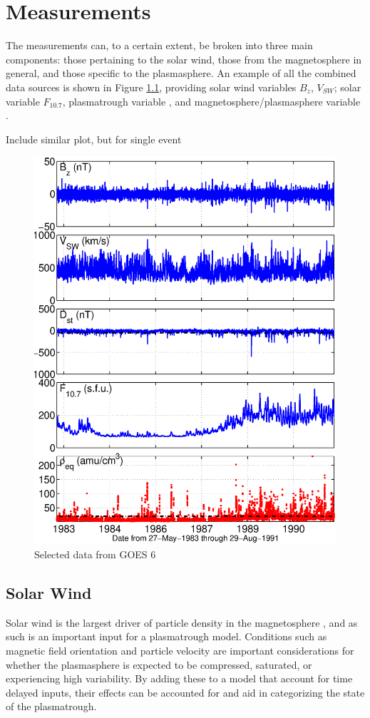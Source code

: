 \chapter[Measurements]{Measurements}


The measurements can, to a certain extent, be broken into three main components: those pertaining to the solar wind, those from the magnetosphere in general, and those specific to the plasmasphere. An example of all the combined data sources is shown in Figure \ref{fig:alldata-GOES6-1983-1991}, providing solar wind variables $B_z$, $V_{SW}$; solar variable $F_{10.7}$, plasmatrough variable \req, and magnetosphere/plasmasphere variable \dst.

\vnote Include similar plot, but for single event

\begin{figure}
	\centering
	\includegraphics[width=0.7\linewidth]{Figures/alldata-GOES6-1983-1991}
	\caption{Selected data from GOES 6}
	\label{fig:alldata-GOES6-1983-1991}
\end{figure}

\section{Solar Wind}
Solar wind is the largest driver of particle density in the magnetosphere , and as such is an important input for a plasmatrough model. Conditions such as magnetic field orientation and particle velocity are important considerations for whether the plasmasphere is expected to be compressed, saturated, or experiencing high variability. By adding these to a model that account for time delayed inputs, their effects can be accounted for and aid in categorizing the state of the plasmatrough.

